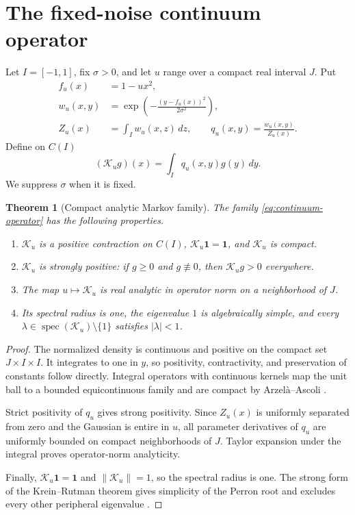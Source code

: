 \documentclass[11pt]{article}
\newtheorem{theorem}{Theorem}[section]
\theoremstyle{definition}
\theoremstyle{remark}
\newcommand{\cK}{\mathcal K}
\newcommand{\spec}{\operatorname{spec}}
\newcommand{\norm}[1]{\left\lVert #1\right\rVert}
\newcommand{\one}{\mathbf 1}
\begin{document}
\section{The fixed-noise continuum operator}
\label{sec:continuum}

Let $I=[-1,1]$, fix $\sigma>0$, and let $u$ range over a compact real interval
$J$.  Put
\begin{align}
  f_u(x)&=1-u x^2,\label{eq:quadratic}\\
  w_u(x,y)&=\exp\left(-\frac{(y-f_u(x))^2}{2\sigma^2}\right),\label{eq:weight}\\
  Z_u(x)&=\int_Iw_u(x,z)\,dz,\qquad
  q_u(x,y)=\frac{w_u(x,y)}{Z_u(x)}.\label{eq:density}
\end{align}
Define on $C(I)$
\begin{equation}\label{eq:continuum-operator}
  (\cK_u g)(x)=\int_Iq_u(x,y)g(y)\,dy.
\end{equation}
We suppress $\sigma$ when it is fixed.

\begin{theorem}[Compact analytic Markov family]\label{thm:continuum}
The family \eqref{eq:continuum-operator} has the following properties.
\begin{enumerate}[label=(\roman*),leftmargin=2.2em]
  \item $\cK_u$ is a positive contraction on $C(I)$,
  $\cK_u\one=\one$, and $\cK_u$ is compact.
  \item $\cK_u$ is strongly positive: if $g\ge0$ and $g\not\equiv0$, then
  $\cK_u g>0$ everywhere.
  \item The map $u\mapsto\cK_u$ is real analytic in operator norm on a
  neighborhood of $J$.
  \item Its spectral radius is one, the eigenvalue $1$ is algebraically
  simple, and every $\lambda\in\spec(\cK_u)\setminus\{1\}$ satisfies
  $|\lambda|<1$.
\end{enumerate}
\end{theorem}

\begin{proof}
The normalized density is continuous and positive on the compact set
$J\times I\times I$.  It integrates to one in $y$, so positivity,
contractivity, and preservation of constants follow directly.  Integral
operators with continuous kernels map the unit ball to a bounded
equicontinuous family and are compact by Arzel\`a--Ascoli
\citep{Kress2014}.

Strict positivity of $q_u$ gives strong positivity.  Since $Z_u(x)$ is
uniformly separated from zero and the Gaussian is entire in $u$, all
parameter derivatives of $q_u$ are uniformly bounded on compact
neighborhoods of $J$.  Taylor expansion under the integral proves
operator-norm analyticity.

Finally, $\cK_u\one=\one$ and $\norm{\cK_u}=1$, so the spectral radius is one.
The strong form of the Krein--Rutman theorem gives simplicity of the Perron
root and excludes every other peripheral eigenvalue
\citep{Schaefer1974}.
\end{proof}
\end{document}
